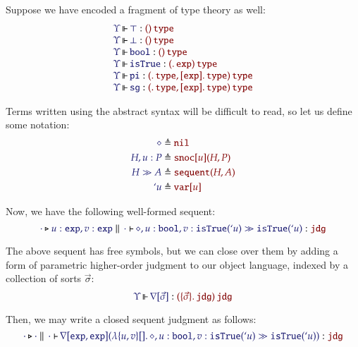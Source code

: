 \documentclass[11pt]{article}
\theoremstyle{definition}
\theoremstyle{remark}
\numberwithin{equation}{section}
\newcommand\SortExp{\mathtt{exp}}
\begin{document}
Suppose we have encoded a fragment of type theory as well:
\[
  \begin{array}{l}
    \IsOperator{\Upsilon}{\top}{
      \MkArity{}{\SortType}
    }
\\
    \IsOperator{\Upsilon}{\bot}{
      \MkArity{}{\SortType}
    }
\\
    \IsOperator{\Upsilon}{\OpBool}{
      \MkArity{}{\SortType}
    }
\\
    \IsOperator{\Upsilon}{\OpSo}{
      \MkArity{
        \MkValence{}{}{\SortExp}
      }{\SortType}
    }
\\
    \IsOperator{\Upsilon}{\OpPi}{
      \MkArity{
        \MkValence{}{}{\SortType},
        \MkValence{}{\SortExp}{\SortType}
      }{\SortType}
    }
\\
    \IsOperator{\Upsilon}{\OpSg}{
      \MkArity{
        \MkValence{}{}{\SortType},
        \MkValence{}{\SortExp}{\SortType}
      }{\SortType}
    }
\\
  \end{array}
\]

Terms written using the abstract syntax will be difficult to read, so let us
define some notation:
\begin{align*}
  \IMode{\diamond}
&
  \triangleq \OMode{\OpNil}
\\
  \IMode{H, u:P}
&
  \triangleq \OMode{
    \App{\OpSnoc{u}}{H, P}
  }
\\
  \IMode{H\gg A}
&
  \triangleq \OMode{
    \App{\OpSequent}{
      H, A
    }
  }
\\
  \IMode{`u}
&
  \triangleq \OMode{\OpVar{u}}
\end{align*}

Now, we have the following well-formed sequent:
\[
  \IsAbt{\cdot}{
    u:\SortExp,
    v:\SortExp
  }{\cdot}{
    \diamond,u:\OpBool,v:\App{\OpSo}{`u}
    \gg
    \App{\OpSo}{`u}
  }{\SortJdg}
\]

\newcommand\OpNabla[1]{\nabla[#1]}

The above sequent has free symbols, but we can close over them by adding a form
of parametric higher-order judgment to our object language, indexed by a
collection of sorts $\vec{\sigma}$:
\[
  \IsOperator{\Upsilon}{\OpNabla{\vec{\sigma}}}{
    \MkArity{
      \MkValence{\vec{\sigma}}{}{\SortJdg}
    }{\SortJdg}
  }
\]

Then, we may write a closed sequent judgment as follows:
\[
  \IsAbt{\cdot}{\cdot}{\cdot}{
    \App{\OpNabla{\SortExp,\SortExp}}{
      \MkBTm{u,v}{}{
        \diamond,u:\OpBool,v:\App{\OpSo}{`u}
        \gg
        \App{\OpSo}{`u}
      }
    }
  }{\SortJdg}
\]
\end{document}
